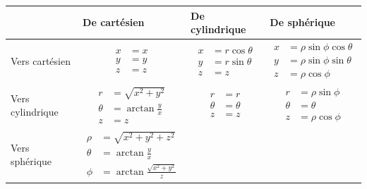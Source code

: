 \begin{table}[htbp]
	\centering
		\begin{tabular}{|p{3cm}|p{3cm}|p{3cm}|p{3cm}|}
		\hline
		 & De cartésien & De cylindrique & De sphérique \\
		\hline 
		 Vers cartésien &
			\vbox{\begin{align*}
			x &= x \\
			y &= y \\
			z &= z
			\end{align*}} 
			& 
			\vbox{\begin{align*}
			x &= r \cos \theta \\
			y &= r \sin \theta \\
			z &= z
			\end{align*}}
			& 
			\vbox{\begin{align*}
			x &= \rho \sin \phi \cos \theta \\
			y &= \rho \sin \phi \sin \theta \\
			z &= \rho \cos \phi
			\end{align*}}
			\\
		\hline
		  Vers cylindrique &
			\vbox{\begin{align*}
			r &= \sqrt{x^2+y^2} \\
			\theta &= \arctan \frac{y}{x} \\
			z &= z
			\end{align*}}
			&  %
			\vbox{\begin{align*}
			r &= r \\
			\theta &= \theta \\
			z &= z
			\end{align*}}
			& %
			\vbox{\begin{align*}
			r &= \rho \sin \phi \\
			\theta &= \theta \\
			z &= \rho \cos \phi
			\end{align*}}
			\\
		\hline
		  Vers sphérique &
			\vbox{\begin{align*}
			\rho &= \sqrt{x^2+y^2+z^2} \\
			\theta &= \arctan \frac{y}{x} \\
			\phi &= \arctan \frac{\sqrt{x^2+y^2}}{z}
			\end{align*}}
			& 
			\vbox{\begin{align*}

\end{align*}}
\end{tabular}
\end{table}
